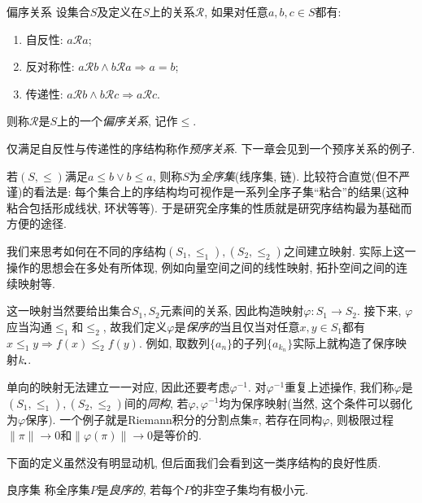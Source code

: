 \begin{definition}{偏序关系}
	设集合$S$及定义在$S$上的关系$\mathcal{R}$, 如果对任意$a, b, c \in S$都有: 
	\begin{enumerate}
		\item 自反性: $a\mathcal{R} a$; 
		\item 反对称性: $a\mathcal{R} b \wedge b\mathcal{R} a \Rightarrow a=b$; 
		\item 传递性: $a\mathcal{R} b \wedge b\mathcal{R} c \Rightarrow a\mathcal{R} c$.
	\end{enumerate}
	则称$\mathcal{R}$是$S$上的一个\textit{偏序关系}, 记作$\leq$.
\end{definition}
\begin{remark}
	仅满足自反性与传递性的序结构称作\textit{预序关系}. 下一章会见到一个预序关系的例子. 
\end{remark}
\begin{remark}
	若$(S,\leq)$满足$a \leq b \vee b \leq a$, 则称$S$为\textit{全序集}(线序集, 链). 比较符合直觉(但不严谨)的看法是: 每个集合上的序结构均可视作是一系列全序子集“粘合”的结果(这种粘合包括形成线状, 环状等等). 于是研究全序集的性质就是研究序结构最为基础而方便的途径. 
\end{remark}

我们来思考如何在不同的序结构$(S_1,\leq _1),(S_2,\leq _2)$之间建立映射. 实际上这一操作的思想会在多处有所体现, 例如向量空间之间的线性映射, 拓扑空间之间的连续映射等. 

这一映射当然要给出集合$S_1,S_2$元素间的关系, 因此构造映射$\varphi :S_1 \to S_2$. 接下来, $\varphi$应当沟通$\leq _1$和$\leq _2$, 故我们定义$\varphi$是\textit{保序的}当且仅当对任意$x,y \in S_1$都有$x \leq _1 y \Rightarrow f(x) \leq _2 f(y)$. 例如, 取数列$\{ a_n \}$的子列$\{ a_{k_n} \}$实际上就构造了保序映射$k_{\bigcdot}$. 

单向的映射无法建立一一对应, 因此还要考虑$\varphi ^{-1}$. 对$\varphi ^{-1}$重复上述操作, 我们称$\varphi$是$(S_1,\leq _1),(S_2,\leq _2)$间的\textit{同构}, 若$\varphi ,\varphi ^{-1}$均为保序映射(当然, 这个条件可以弱化为$\varphi$保序). 一个例子就是Riemann积分的分割点集$\pi$, 若存在同构$\varphi$, 则极限过程$\| \pi \| \to 0$和$\| \varphi(\pi) \| \to 0$是等价的. 

下面的定义虽然没有明显动机, 但后面我们会看到这一类序结构的良好性质. 

\begin{definition}{良序集}
	称全序集$P$是\textit{良序的}, 若每个$P$的非空子集均有极小元. 
\end{definition}

